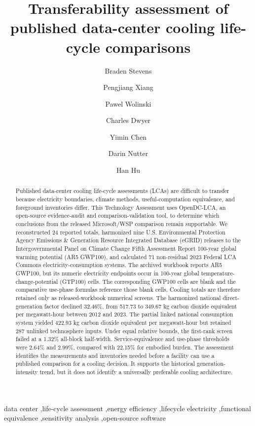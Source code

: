 \documentclass[review,12pt]{elsarticle}
\begin{document}
\begin{frontmatter}
\title{Transferability assessment of published data-center cooling life-cycle comparisons}
\author[uark,hfa]{Braden Stevens}
\author[uark,hfa]{Pengjiang Xiang}
\author[ahpcc]{Pawel Wolinski}
\author[its]{Charles Dwyer}
\author[ornl]{Yimin Chen}
\author[uark]{Darin Nutter}
\author[uark]{Han Hu}
\address[uark]{Department of Mechanical Engineering, University of Arkansas, Fayetteville, AR 72701, U.S.}
\address[ahpcc]{Arkansas High Performance Computing Center, University of Arkansas, Fayetteville, AR 72701, U.S.}
\address[its]{IT Services, University of Arkansas, Fayetteville, AR 72701, U.S.}
\address[ornl]{Building Technologies Research and Integration Center, Oak Ridge National Laboratory, Oak Ridge, TN 37830, U.S.}
\address[hfa]{Harrison French \& Associates Ltd., Bentonville, AR 72712, U.S.}
\begin{abstract}
Published data-center cooling life-cycle assessments (LCAs) are difficult to transfer because electricity boundaries, climate methods, useful-computation equivalence, and foreground inventories differ. This Technology Assessment uses OpenDC-LCA, an open-source evidence-audit and comparison-validation tool, to determine which conclusions from the released Microsoft/WSP comparison remain supportable. We reconstructed 24 reported totals, harmonized nine U.S. Environmental Protection Agency Emissions \& Generation Resource Integrated Database (eGRID) releases to the Intergovernmental Panel on Climate Change Fifth Assessment Report 100-year global warming potential (AR5 GWP100), and calculated 71 non-residual 2023 Federal LCA Commons electricity-consumption systems. The archived workbook reports AR5 GWP100, but its numeric electricity endpoints occur in 100-year global temperature-change-potential (GTP100) cells. The corresponding GWP100 cells are blank and the comparative use-phase formulas reference those blank cells. Cooling totals are therefore retained only as released-workbook numerical screens. The harmonized national direct-generation factor declined 32.46\%, from 517.73 to 349.67 kg carbon dioxide equivalent per megawatt-hour between 2012 and 2023. The partial linked national consumption system yielded 422.93 kg carbon dioxide equivalent per megawatt-hour but retained 287 unlinked technosphere inputs. Under equal relative bounds, the first-rank screen failed at a 1.32\% all-block half-width. Service-equivalence and use-phase thresholds were 2.64\% and 2.99\%, compared with 22.15\% for embodied burden. The assessment identifies the measurements and inventories needed before a facility can use a published comparison for a cooling decision. It supports the historical generation-intensity trend, but it does not identify a universally preferable cooling architecture.

\end{abstract}
\begin{keyword}
data center \sep life-cycle assessment \sep energy efficiency \sep lifecycle electricity \sep functional equivalence \sep sensitivity analysis \sep open-source software
\end{keyword}
\end{frontmatter}
\end{document}
